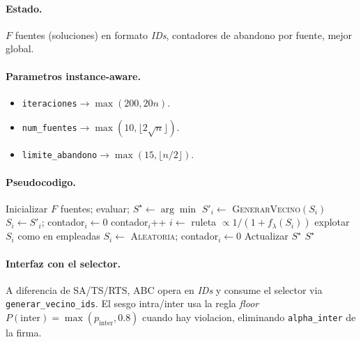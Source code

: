 \documentclass[11pt,a4paper]{article}
\newcommand{\code}[1]{\texttt{#1}}
\begin{document}
\paragraph{Estado.} $F$ fuentes (soluciones) en formato \emph{IDs},
contadores de abandono por fuente, mejor global.

\paragraph{Parametros instance-aware.}
\begin{itemize}
\item \code{iteraciones}$\to \max(200, 20n)$.
\item \code{num\_fuentes}$\to \max(10, \lfloor 2\sqrt{n}\rfloor)$.
\item \code{limite\_abandono}$\to \max(15, \lfloor n/2\rfloor)$.
\end{itemize}

\paragraph{Pseudocodigo.}
\begin{algorithm}[H]
\caption{Artificial Bee Colony Simple}
\begin{algorithmic}[1]
\State Inicializar $F$ fuentes; evaluar; $S^\star\gets\arg\min$
   
     \State $S'_i \gets$ \textsc{GenerarVecino}$(S_i)$
        \State $S_i\gets S'_i$; contador$_i\gets 0$
     \Else{} contador$_i$++ \EndIf
  \EndFor
     \State $i\gets$ ruleta $\propto 1/(1+f_\lambda(S_i))$
     \State explotar $S_i$ como en empleadas
  \EndFor
     \State $S_i \gets$ \textsc{Aleatoria}; contador$_i\gets 0$
  \EndFor
  \State Actualizar $S^\star$
\EndFor
\State \Return $S^\star$
\end{algorithmic}
\end{algorithm}

\paragraph{Interfaz con el selector.} A diferencia de SA/TS/RTS, ABC
opera en \emph{IDs} y consume el selector via
\code{generar\_vecino\_ids}. El sesgo intra/inter usa la regla
\emph{floor} $P(\text{inter})=\max(p_\text{inter}, 0.8)$ cuando hay
violacion, eliminando \code{alpha\_inter} de la firma.
\end{document}
